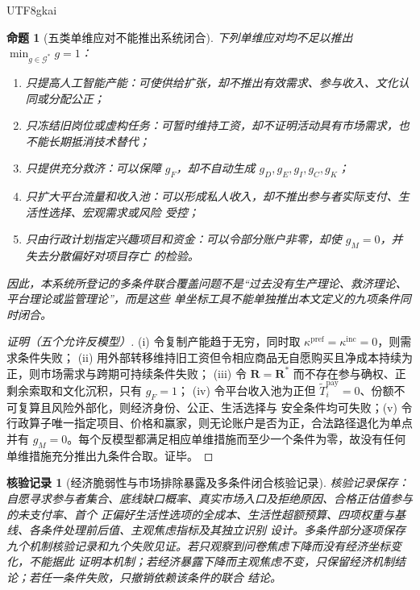 \documentclass[12pt,a4paper,openany]{report}
\newtheorem{proposition}{命题}[chapter]
\newtheorem{Certificate}{核验记录}[chapter]
\begin{document}
\begin{CJK*}{UTF8}{gkai}
\begin{proposition}[五类单维应对不能推出系统闭合]
\label{prop:one-dimensional-responses-insufficient}
下列单维应对均不足以推出 \(\min_{g\in\mathcal G^*}g=1\)：
\begin{enumerate}[label=\textup{(\roman*)},leftmargin=3em]
  \item 只提高人工智能产能：可使供给扩张，却不推出有效需求、参与收入、文化认同或分配公正；
  \item 只冻结旧岗位或虚构任务：可暂时维持工资，却不证明活动具有市场需求，也不能长期抵消技术替代；
  \item 只提供充分救济：可以保障 \(g_F\)，却不自动生成 \(g_D,g_E,g_I,g_C,g_K\)；
  \item 只扩大平台流量和收入池：可以形成私人收入，却不推出参与者实际支付、生活性选择、宏观需求或风险
  受控；
  \item 只由行政计划指定兴趣项目和资金：可以令部分账户非零，却使 \(g_M=0\)，并失去分散偏好对项目存亡
  的检验。
\end{enumerate}
因此，本系统所登记的多条件联合覆盖问题不是“过去没有生产理论、救济理论、平台理论或监管理论”，而是这些
单坐标工具不能单独推出本文定义的九项条件同时闭合。
\end{proposition}

\begin{proof}[证明（五个允许反模型）]
(i) 令复制产能趋于无穷，同时取 \(\kappa^{\mathrm{pref}}=\kappa^{\mathrm{inc}}=0\)，则需求条件失败；
(ii) 用外部转移维持旧工资但令相应商品无自愿购买且净成本持续为正，则市场需求与跨期可持续条件失败；
(iii) 令 \(\mathbf R=\mathbf R^*\) 而不存在参与确权、正剩余索取和文化沉积，只有 \(g_F=1\)；
(iv) 令平台收入池为正但 \(\widetilde T_i^{\mathrm{pay}}=0\)、份额不可复算且风险外部化，则经济身份、公正、生活选择与
安全条件均可失败；(v) 令行政算子唯一指定项目、价格和赢家，则无论账户是否为正，合法路径退化为单点并有
\(g_M=0\)。每个反模型都满足相应单维措施而至少一个条件为零，故没有任何单维措施充分推出九条件合取。证毕。
\end{proof}

\begin{Certificate}[经济脆弱性与市场排除暴露及多条件闭合核验记录]
核验记录保存：自愿寻求参与者集合、底线缺口概率、真实市场入口及拒绝原因、合格正估值参与的未支付率、首个
正偏好生活性选项的全成本、生活性超额预算、四项权重与基线、各条件处理前后值、主观焦虑指标及其独立识别
设计。多条件部分逐项保存九个机制核验记录和九个失败见证。若只观察到问卷焦虑下降而没有经济坐标变化，不能据此
证明本机制；若经济暴露下降而主观焦虑不变，只保留经济机制结论；若任一条件失败，只撤销依赖该条件的联合
结论。
\end{Certificate}


\end{CJK*}
\end{document}
